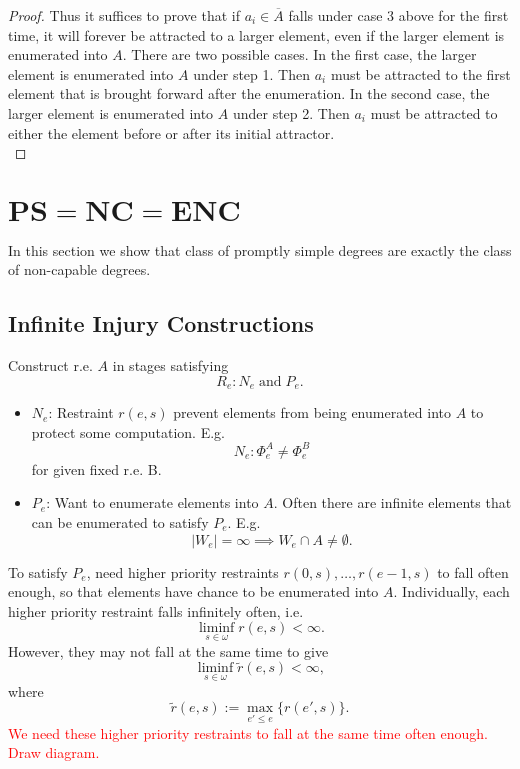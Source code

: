 \documentclass{article}
\newcommand{\COMMENT}[1]{\textcolor{red}{#1}}
\begin{document}
\begin{proof}
    Thus it suffices to prove that if $a_i\in\overline{A}$ falls under case
    3 above for the first time, it will forever be attracted to a larger
    element, even if the larger element is enumerated into $A$. There are
    two possible cases. In the first case, the larger element is enumerated
    into $A$ under step 1. Then $a_i$ must be attracted to the first
    element that is brought forward after the enumeration. In the second
    case, the larger element is enumerated into $A$ under step 2. Then
    $a_i$ must be attracted to either the element before or after its
    initial attractor. \\
  \end{proof}

\section{$\bm{PS}=\bm{NC}=\bm{ENC}$}
  In this section we show that class of promptly simple degrees are exactly
  the class of non-capable degrees.

\subsection{Infinite Injury Constructions}
  \label{section:infinite-injury}
  Construct r.e. $A$ in stages satisfying
  \[R_e: N_e\; \text{and}\; P_e.\]
  \begin{itemize}
    \item $N_e$: Restraint $r(e,s)$ prevent elements from being enumerated
      into $A$ to protect some computation. E.g.
      \[N_e: \Phi_e^A\neq \Phi_e^B\]
      for given fixed r.e. B.

    \item $P_e$: Want to enumerate elements into $A$. Often there are
      infinite elements that can be enumerated to satisfy $P_e$. E.g.
      \[|W_e|=\infty \implies W_e\cap A\neq\emptyset.\]
  \end{itemize}

  To satisfy $P_e$, need higher priority restraints
  $r(0,s),\ldots,r(e-1,s)$ to fall often enough, so that elements have
  chance to be enumerated into $A$. Individually, each higher priority
  restraint falls infinitely often, i.e.
  \[\liminf_{s\in\omega} r(e,s)<\infty.\]
  However, they may not fall at the same time to give
  \begin{equation}
    \liminf_{s\in\omega}\tilde{r}(e,s)<\infty,
    \label{eqn:liminf}
  \end{equation}
  where
  \[\tilde{r}(e,s) :=\max_{e'\leq e}\{r(e',s)\}.\]
  \COMMENT{We need these higher priority restraints to fall at the same
  time often enough. Draw diagram.}\\
\end{document}
